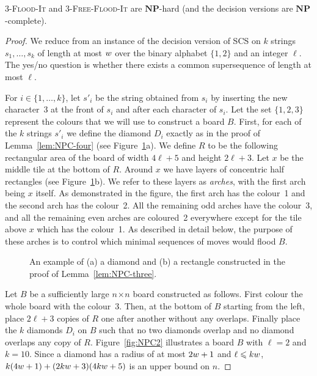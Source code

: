 \documentclass[a4paper,11pt]{llncs}
\newcommand{\pgfgraphic}[1]{}
\newcounter{l}
\renewcommand{\leq}{\leqslant}
\newcommand{\NPtime}{\ensuremath{\mathbf{NP}}}
\newcommand{\Coloroid}[1]{$#1$-\textsc{Flood-It}}
\newcommand{\ColoroidFree}[1]{$#1$-\textsc{Free-Flood-It}}
\newcommand{\SCS}{\textsc{SCS}}
\newcommand{\recdim}[2]{$#1$$\mspace{1mu}$$\times$$\mspace{1mu}$$#2$}
\begin{document}
\begin{lemma}
    \label{lem:NPC-three}
    \Coloroid{3} and \ColoroidFree{3} are \NPtime-hard (and the decision versions are \NPtime-complete).
\end{lemma}
\begin{proof}
    We reduce from an instance of the decision version of \SCS{} on $k$ strings $s_1,\dots,s_k$ of length at most $w$ over the binary alphabet $\{1,2\}$ and an integer $\ell$. The yes/no question is whether there exists a common supersequence of length at most $\ell$.

    For $i\in \{1,\dots,k\}$, let $s'_i$ be the string obtained from $s_i$ by inserting the new character~3 at the front of $s_i$ and after each character of $s_i$. Let the set $\{1,2,3\}$ represent the colours that we will use to construct a board $B$. First, for each of the $k$ strings $s'_i$ we define the diamond $D_i$ exactly as in the proof of Lemma~\ref{lem:NPC-four} (see Figure~\ref{fig:NPC}a). We define $R$ to be the following rectangular area of the board of width $4\ell+5$ and height $2\ell+3$. Let $x$ be the middle tile at the bottom of $R$. Around $x$ we have layers of concentric half rectangles (see Figure~\ref{fig:NPC}b). We refer to these layers as \emph{arches}, with the first arch being $x$ itself. As demonstrated in the figure, the first arch has the colour~1 and the second arch has the colour~2. All the remaining odd arches have the colour~3, and all the remaining even arches are coloured~2 everywhere except for the tile above $x$ which has the colour~1. As described in detail below, the purpose of these arches is to control which minimal sequences of moves would flood $B$.


\begin{figure}[t]
\centering
	\pgfgraphic{graphic-npc}
\caption{ An example of (a) a diamond and (b) a rectangle constructed in the proof of Lemma~\ref{lem:NPC-three}.}
\label{fig:NPC}
\end{figure}

    Let $B$ be a sufficiently large \recdim{n}{n} board constructed as follows. First colour the whole board with the colour~3. Then, at the bottom of $B$ starting from the left, place $2\ell+3$ copies of $R$ one after another without any overlaps. Finally place the $k$ diamonds $D_i$ on $B$ such that no two diamonds overlap and no diamond overlaps any copy of $R$. Figure~\ref{fig:NPC2} illustrates a board $B$ with $\ell=2$ and $k=10$. Since a diamond has a radius of at most $2w+1$ and $\ell\leq k\stl$, $k(4w+1)+(2kw+3)(4kw+5)$ is an upper bound on $n$.


\end{proof}
\end{document}
